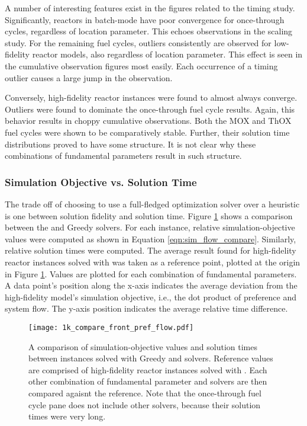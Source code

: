 A number of interesting features exist in the figures related to the \cbc timing
study. Significantly, reactors in batch-mode have poor convergence for
once-through cycles, regardless of location parameter. This echoes
observations in the scaling study. For the remaining fuel cycles, outliers
consistently are observed for low-fidelity reactor models, also regardless of
location parameter. This effect is seen in the cumulative observation figures
most easily. Each occurrence of a timing outlier causes a large jump in the
observation. 

Conversely, high-fidelity reactor instances were found to almost always
converge. Outliers were found to dominate the once-through fuel cycle
results. Again, this behavior results in choppy cumulative observations. Both
the MOX and ThOX fuel cycles were shown to be comparatively stable. Further,
their solution time distributions proved to have some structure. It is not clear
why these combinations of fundamental parameters result in such structure.

\subsubsection{Simulation Objective vs. Solution Time}

The trade off of choosing to use a full-fledged optimization solver over a
heuristic is one between solution fidelity and solution time. Figure
\ref{fig:1k_compare_front_pref_flow} shows a comparison between the \cbc and
Greedy solvers. For each instance, relative simulation-objective values were
computed as shown in Equation \ref{eqn:sim_flow_compare}. Similarly, relative
solution times were computed. The average result found for high-fidelity reactor
instances solved with \cbc was taken as a reference point, plotted at the origin
in Figure \ref{fig:1k_compare_front_pref_flow}. Values are plotted for each
combination of fundamental parameters. A data point's position along the x-axis
indicates the average deviation from the high-fidelity model's simulation
objective, i.e., the dot product of preference and system flow. The y-axis
position indicates the average relative time difference.

\begin{figure}[h!]
  \begin{center}
    \texttt{[image: 1k\_compare\_front\_pref\_flow.pdf]}
    \caption{
      \label{fig:1k_compare_front_pref_flow}
      A comparison of simulation-objective values and solution times between
      instances solved with Greedy and \cbc solvers. Reference values are
      comprised of high-fidelity reactor instances solved with \cbc. Each other
      combination of fundamental parameter and solvers are then compared agaisnt
      the reference. Note that the once-through fuel cycle pane does not include
      other \cbc solvers, because their solution times were very long.
    }
  \end{center}
\end{figure}

